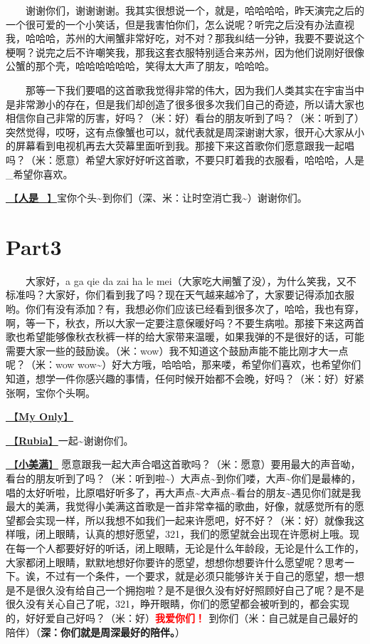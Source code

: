 \documentclass[]{ctexbook}
\begin{document}
  谢谢你们，谢谢谢谢。我其实很想说一个，就是，哈哈哈哈，昨天演完之后的一个很可爱的一个小笑话，但是我害怕你们，怎么说呢？听完之后没有办法直视我，哈哈哈，苏州的大闸蟹非常好吃，对不对？那我纠结一分钟，我要不要说这个梗啊？说完之后不许嘲笑我，那我这套衣服特别适合来苏州，因为他们说刚好很像公蟹的那个壳，哈哈哈哈哈哈，笑得太大声了朋友，哈哈哈。

  那等一下我们要唱的这首歌我觉得非常的伟大，因为我们人类其实在宇宙当中是非常渺小的存在，但是我们却创造了很多很多次我们自己的奇迹，所以请大家也相信你自己非常的厉害，好吗？（米：好）看台的朋友听到了吗？（米：听到了）突然觉得，哎呀，这有点像蟹也可以，就代表就是周深谢谢大家，很开心大家从小的屏幕看到电视机再去大荧幕里面听到我。那接下来这首歌你们愿意跟我一起唱吗？（米：愿意）希望大家好好听这首歌，不要只盯着我的衣服看，哈哈哈，人是\_希望你喜欢。

\hyperref[renshi]{🎵【\textbf{人是\_}】}宝你个头\textasciitilde 到你们（深、米：让时空消亡我\textasciitilde）谢谢你们。

\section{Part3}\label{suzhou-20241110-part3}

  大家好，a ga qie da zai ha le mei（大家吃大闸蟹了没），为什么笑我，又不标准吗？大家好，你们看到我了吗？现在天气越来越冷了，大家要记得添加衣服哟。你们有没有添加？有，我想必你们应该已经看到很多次了，哈哈，我也有穿，啊，等一下，秋衣，所以大家一定要注意保暖好吗？不要生病啦。那接下来这两首歌也希望能够像秋衣秋裤一样的给大家带来温暖，如果我弹的不是很好的话，可能需要大家一些的鼓励诶。（米：wow）我不知道这个鼓励声能不能比刚才大一点呢？（米：wow wow\textasciitilde）好大方哦，哈哈哈，那来喽，希望你们喜欢，也希望你们知道，想学一件你感兴趣的事情，任何时候开始都不会晚，好吗？（米：好）好紧张啊，宝你个头啊。

\hyperref[my-only]{🎵【\textbf{My Only}】}

\hyperref[rubia]{🎵【\textbf{Rubia}】}一起\textasciitilde 谢谢你们。

\hyperref[happy-ending]{🎵【\textbf{小美满}】} 愿意跟我一起大声合唱这首歌吗？（米：愿意）要用最大的声音呦，看台的朋友听到了吗？（米：听到啦\textasciitilde）大声点\textasciitilde 到你们喽，大声\textasciitilde 你们是最棒的，唱的太好听啦，比原唱好听多了，再大声点\textasciitilde 大声点\textasciitilde 看台的朋友\textasciitilde 遇见你们就是我最大的美满，我觉得小美满这首歌是一首非常幸福的歌曲，好像，就感觉所有的愿望都会实现一样，所以我想不如我们一起来许愿吧，好不好？（米：好）就像我这样哦，闭上眼睛，认真的想好愿望，321，我们的愿望就会出现在许愿树上哦。现在每一个人都要好好的听话，闭上眼睛，无论是什么年龄段，无论是什么工作的，大家都闭上眼睛，默默地想好你要许的愿望，想想你想要许什么愿望呢？思考一下。诶，不过有一个条件，一个要求，就是必须只能够许关于自己的愿望，想一想是不是很久没有给自己一个拥抱啦？是不是很久没有好好照顾好自己了呢？是不是很久没有关心自己了呢，321，睁开眼睛，你们的愿望都会被听到的，都会实现的，好好爱自己好吗？（米：好）\textbf{\textcolor{red}{我爱你们！ }}到你们（米：自己就是自己最好的陪伴）（\textbf{深：你们就是周深最好的陪伴。}）
\end{document}
